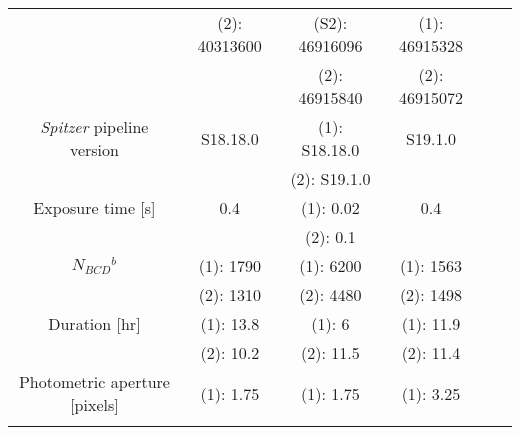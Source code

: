 \documentclass[traditabstract]{aa}
\begin{document}
\begin{appendix}
\begin{table*}
\begin{center}
{\begin{tabular}{cccccc}
                                                                           & (2): 40313600                   &  (S2): 46916096              & (1): 46915328             \\ \noalign {\smallskip} 
                                                                           &                                          & (2): 46915840                  & (2): 46915072            \\ \noalign {\smallskip} 
{\it Spitzer} pipeline version                               & S18.18.0                                 & (1): S18.18.0                 & S19.1.0                         \\ \noalign {\smallskip}     
                                                                           &                                            &   (2): S19.1.0                      &                                      \\ \noalign {\smallskip}     
Exposure time [s]                                               & 0.4                                       & (1): 0.02                               & 0.4                               \\ \noalign {\smallskip} 
                                                                           &                                             & (2): 0.1                              &                                    \\ \noalign {\smallskip} 
$N_{BCD}$$^b$                                                & (1): 1790                               & (1): 6200                      & (1): 1563                  \\ \noalign {\smallskip} 
                                                                           & (2): 1310                               &  (2): 4480                   & (2): 1498                           \\ \noalign {\smallskip} 
Duration  [hr]                                                      & (1): 13.8                               & (1): 6                          & (1): 11.9                      \\ \noalign {\smallskip}  
                                                                           & (2): 10.2                              &  (2): 11.5                       &(2): 11.4                                    \\ \noalign {\smallskip} 
Photometric aperture [pixels]                             & (1): 1.75                             &  (1): 1.75                       & (1): 3.25                         \\ \noalign {\smallskip}  
$$
\end{tabular}}
\end{center}
\end{table*}
\end{appendix}
\end{document}
